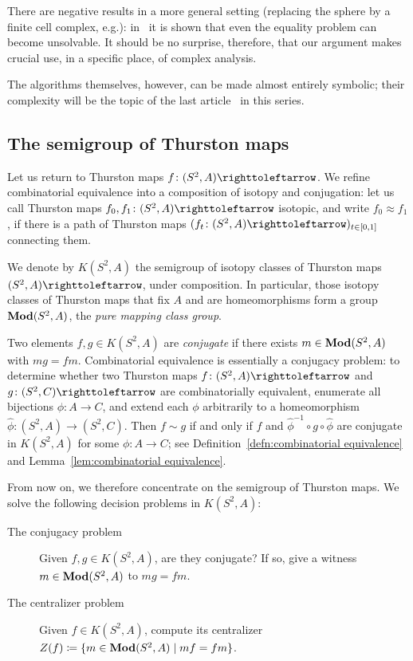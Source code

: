 \documentclass{amsart}
\begin{document}
There are negative results in a more general setting (replacing the
sphere by a finite cell complex, e.g.): in~\cite{bartholdi:wordorder}
it is shown that even the equality problem can become unsolvable. It
should be no surprise, therefore, that our argument makes crucial use,
in a specific place, of complex analysis.

The algorithms themselves, however, can be made almost entirely
symbolic; their complexity will be the topic of the last
article~\cite{bartholdi-dudko:bc5} in this series.

\subsection{The semigroup of Thurston maps}
Let us return to Thurston maps $f\colon(S^2,A)\selfmap$. We refine
combinatorial equivalence into a composition of isotopy and
conjugation: let us call Thurston maps $f_0,f_1\colon(S^2,A)\selfmap$
isotopic, and write $f_0\approx f_1$, if there is a path of Thurston
maps $(f_t\colon(S^2,A)\selfmap)_{t\in[0,1]}$ connecting them.

We denote by $K(S^2,A)$ the semigroup of isotopy classes of Thurston
maps $(S^2,A)\selfmap$, under composition.  In particular, those
isotopy classes of Thurston maps that fix $A$ and are homeomorphisms
form a group $\mathbf{\relax Mod}(S^2,A)$, the \emph{pure mapping class group}.

Two elements $f,g\in K(S^2,A)$ are \emph{conjugate} if there exists
$m\in\mathbf{\relax Mod}(S^2,A)$ with $m g=f m$. Combinatorial equivalence is
essentially a conjugacy problem: to determine whether two Thurston
maps $f\colon(S^2,A)\selfmap$ and $g\colon(S^2,C)\selfmap$ are
combinatorially equivalent, enumerate all bijections
$\phi\colon A\to C$, and extend each $\phi$ arbitrarily to a
homeomorphism $\widehat\phi\colon(S^2,A)\to(S^2,C)$. Then $f\sim g$ if
and only if $f$ and $\widehat\phi^{-1}\circ g\circ\widehat\phi$ are
conjugate in $K(S^2,A)$ for some $\phi\colon A\to C$; see
Definition~\ref{defn:combinatorial equivalence} and
Lemma~\ref{lem:combinatorial equivalence}.

From now on, we therefore concentrate on the semigroup of Thurston
maps. We solve the following decision problems in $K(S^2,A)$:
\begin{description}
\item[The conjugacy problem] Given $f,g\in K(S^2,A)$, are they
  conjugate? If so, give a witness
  $m\in\mathbf{\relax Mod}(S^2,A)$ to $mg=f m$.
\item[The centralizer problem] Given $f\in K(S^2,A)$, compute
  its centralizer $Z(f)\coloneqq\{m\in\mathbf{\relax Mod}(S^2,A)\mid m f=f m\}$.
\end{description}
\end{document}
